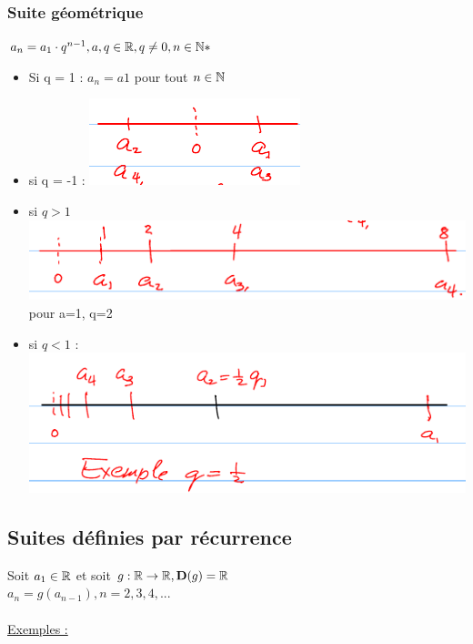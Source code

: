 \documentclass[12pt,a4paper]{article}
\begin{document}
{\subsubsection{Suite géométrique}
$a_n = a_1 \cdot q^{n-1}, a,q\in \mathbb{R}, q \neq 0, n\in \mathbb{N*}$
\begin{itemize}
\item Si q = 1 : $a_n = a1$ pour tout $n \in \mathbb{N}$
\item si q = -1 : \includegraphics[scale=0.5]{illustrations_Analyse/suite_geometrique}
\item si $q > 1 $ \includegraphics[scale=0.5]{illustrations_Analyse/suite_geometrique_geq_1} pour a=1, q=2
\item si $q < 1$ : \includegraphics[scale=0.5]{illustrations_Analyse/suite_geometrique_leq_1}
\end{itemize}
\subsection{Suites définies par récurrence}
Soit $a_1 \in \mathbb{R}$ et soit $g : \mathbb{R} \to \mathbb{R}, \mathbf{D}(g) = \mathbb{R}$\\
$a_n = g(a_{n-1}), n = 2,3,4,...$\\
\\
\underline{Exemples :}

}
\end{document}
